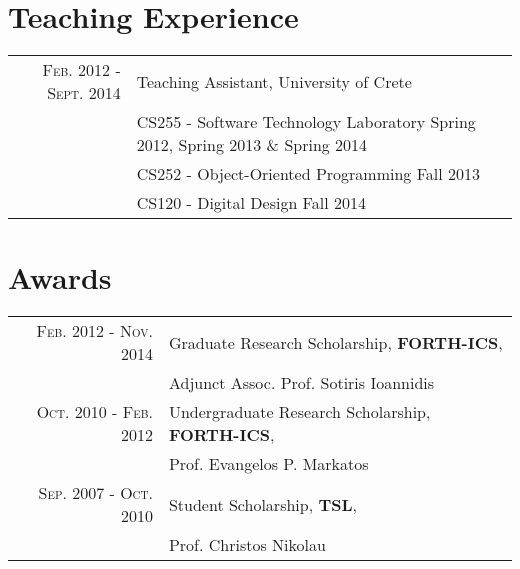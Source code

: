 \documentclass[a4paper,10pt]{article} %
\begin{document}

\section{Teaching Experience}

\begin{tabular}{rl}

\textsc{Feb. 2012 - Sept. 2014} & Teaching Assistant, University of Crete \\
& CS255 - Software Technology Laboratory \small Spring 2012, Spring 2013 \& Spring 2014 \\
& CS252 - Object-Oriented Programming \small Fall 2013\\
& CS120 - Digital Design \small Fall 2014
\\

\end{tabular}


\section{Awards}

\begin{tabular}{rl}

\textsc{Feb. 2012 - Nov. 2014} & Graduate Research Scholarship, \textbf{FORTH-ICS}, \\
& Adjunct Assoc. Prof. Sotiris Ioannidis \\

\textsc{Oct. 2010 - Feb. 2012} & Undergraduate Research Scholarship, \textbf{FORTH-ICS}, \\
& Prof. Evangelos P.  Markatos \\


\textsc{Sep. 2007 - Oct. 2010} & Student Scholarship, \textbf{TSL}, \\
& Prof. Christos Nikolau \\

\end{tabular}

\end{document}

